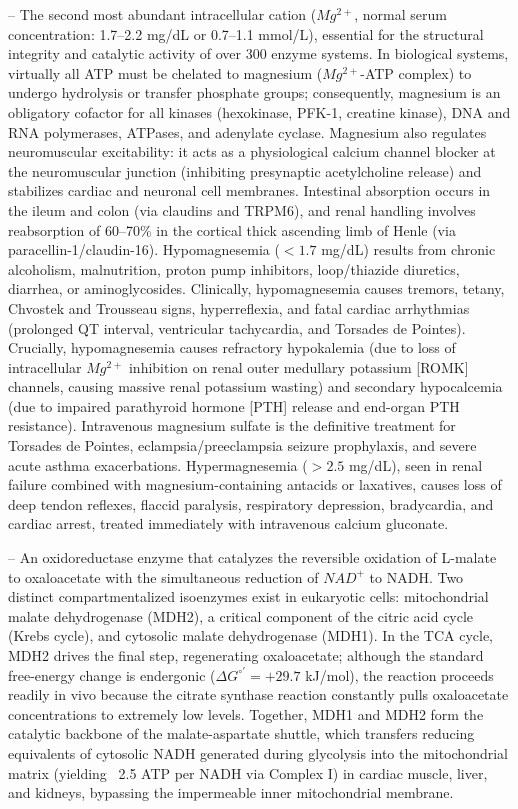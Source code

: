 -- The second most abundant intracellular cation ($Mg^{2+}$, normal serum concentration: 1.7--2.2 mg/dL or 0.7--1.1 mmol/L), essential for the structural integrity and catalytic activity of over 300 enzyme systems. In biological systems, virtually all ATP must be chelated to magnesium ($Mg^{2+}$-ATP complex) to undergo hydrolysis or transfer phosphate groups; consequently, magnesium is an obligatory cofactor for all kinases (hexokinase, PFK-1, creatine kinase), DNA and RNA polymerases, ATPases, and adenylate cyclase. Magnesium also regulates neuromuscular excitability: it acts as a physiological calcium channel blocker at the neuromuscular junction (inhibiting presynaptic acetylcholine release) and stabilizes cardiac and neuronal cell membranes. Intestinal absorption occurs in the ileum and colon (via claudins and TRPM6), and renal handling involves reabsorption of 60--70\% in the cortical thick ascending limb of Henle (via paracellin-1/claudin-16). Hypomagnesemia ($<1.7$ mg/dL) results from chronic alcoholism, malnutrition, proton pump inhibitors, loop/thiazide diuretics, diarrhea, or aminoglycosides. Clinically, hypomagnesemia causes tremors, tetany, Chvostek and Trousseau signs, hyperreflexia, and fatal cardiac arrhythmias (prolonged QT interval, ventricular tachycardia, and Torsades de Pointes). Crucially, hypomagnesemia causes refractory hypokalemia (due to loss of intracellular $Mg^{2+}$ inhibition on renal outer medullary potassium [ROMK] channels, causing massive renal potassium wasting) and secondary hypocalcemia (due to impaired parathyroid hormone [PTH] release and end-organ PTH resistance). Intravenous magnesium sulfate is the definitive treatment for Torsades de Pointes, eclampsia/preeclampsia seizure prophylaxis, and severe acute asthma exacerbations. Hypermagnesemia ($>2.5$ mg/dL), seen in renal failure combined with magnesium-containing antacids or laxatives, causes loss of deep tendon reflexes, flaccid paralysis, respiratory depression, bradycardia, and cardiac arrest, treated immediately with intravenous calcium gluconate.

-- An oxidoreductase enzyme that catalyzes the reversible oxidation of L-malate to oxaloacetate with the simultaneous reduction of $NAD^+$ to NADH. Two distinct compartmentalized isoenzymes exist in eukaryotic cells: mitochondrial malate dehydrogenase (MDH2), a critical component of the citric acid cycle (Krebs cycle), and cytosolic malate dehydrogenase (MDH1). In the TCA cycle, MDH2 drives the final step, regenerating oxaloacetate; although the standard free-energy change is endergonic ($\Delta G^{\circ\prime} = +29.7$ kJ/mol), the reaction proceeds readily in vivo because the citrate synthase reaction constantly pulls oxaloacetate concentrations to extremely low levels. Together, MDH1 and MDH2 form the catalytic backbone of the malate-aspartate shuttle, which transfers reducing equivalents of cytosolic NADH generated during glycolysis into the mitochondrial matrix (yielding ~2.5 ATP per NADH via Complex I) in cardiac muscle, liver, and kidneys, bypassing the impermeable inner mitochondrial membrane.

